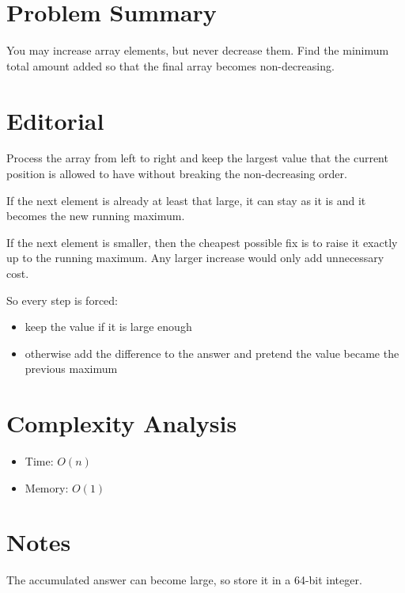 \section{Problem Summary}
You may increase array elements, but never decrease them. Find the minimum total amount added so that the final array becomes non-decreasing.

\section{Editorial}
Process the array from left to right and keep the largest value that the current position is allowed to have without breaking the non-decreasing order.

If the next element is already at least that large, it can stay as it is and it becomes the new running maximum.

If the next element is smaller, then the cheapest possible fix is to raise it exactly up to the running maximum. Any larger increase would only add unnecessary cost.

So every step is forced:
\begin{itemize}
\item keep the value if it is large enough
\item otherwise add the difference to the answer and pretend the value became the previous maximum
\end{itemize}

\section{Complexity Analysis}
\begin{itemize}
\item Time: \(O(n)\)
\item Memory: \(O(1)\)
\end{itemize}

\section{Notes}
The accumulated answer can become large, so store it in a 64-bit integer.
